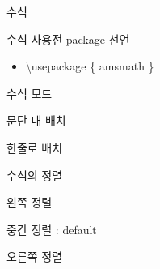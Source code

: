 \documentclass[ aspectratio=149,  10pt,blue,xcolor=pdftex,dvipsnames,table,handout,notes]{beamer}
\begin{document}

		\begin{frame}[plain]
		\centering
		\scalebox{10}{수식}

		\note[item]{}
		\end{frame}





		\begin{frame}[t]{수식}

			\begin{block} {수식 사용전 package 선언}
			\begin{itemize}
			\item[]	\textbackslash usepackage \{ amsmath \}
			\end{itemize}
			\end{block}

		\note[item]{}
		\end{frame}



		\begin{frame}[t]{수식 모드}

			\begin{block} {문단 내 배치}
			\end{block}

			\begin{block} {한줄로 배치}
			\end{block}

		\note[item]{}
		\end{frame}


		\begin{frame}[t]{수식의 정렬}

			\begin{block} {왼쪽 정렬}
			\end{block}

			\begin{block} {중간 정렬 : default}
			\end{block}

			\begin{block} {오른쪽 정렬}
			\end{block}

		\note[item]{}
		\end{frame}
\end{document}
